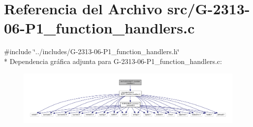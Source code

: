 \hypertarget{G-2313-06-P1__function__handlers_8c}{}\section{Referencia del Archivo src/\+G-\/2313-\/06-\/\+P1\+\_\+function\+\_\+handlers.c}
\label{G-2313-06-P1__function__handlers_8c}
{\ttfamily \#include \char`\"{}../includes/\+G-\/2313-\/06-\/\+P1\+\_\+function\+\_\+handlers.\+h\char`\"{}}\\*
Dependencia gráfica adjunta para G-\/2313-\/06-\/\+P1\+\_\+function\+\_\+handlers.c\+:\nopagebreak
\begin{figure}[H]
\begin{center}
\leavevmode
\includegraphics[width=350pt]{G-2313-06-P1__function__handlers_8c__incl}
\end{center}
\end{figure}
